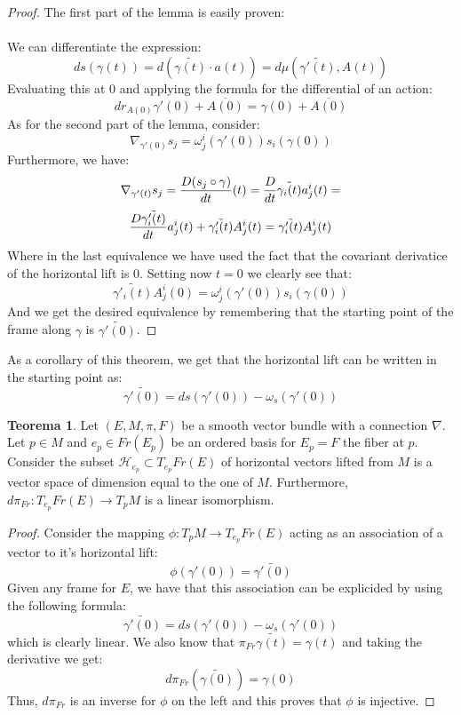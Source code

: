 \documentclass[12pt,a4paper]{report}
\theoremstyle{definition}
\theoremstyle{Theorem}
\newtheorem{Theo}[Def]{Teorema}
\theoremstyle{definition}
\theoremstyle{definition}
\theoremstyle{definition}
\begin{document}
			\begin{proof}
				The first part of the lemma is easily proven:\\
				\\
				We can differentiate the expression:
				$$ds(\gamma(t))=d(\tilde{\gamma(t)}\cdot a(t))=d\mu(\tilde{\gamma'(t)},A(t))$$
				Evaluating this at 0 and applying the formula for the differential of an action:
				$$dr_{A(0)}\gamma'(0)+\overline{A(0)}=\gamma(0)+\overline{A(0)}$$
				As for the second part of the lemma, consider:
				$$\nabla_{\gamma'(0)}s_j=\omega^i_j(\gamma'(0))s_i(\gamma(0))$$
				Furthermore, we have:
				$$\nabla_{\gamma'(t)}s_j={D (s_j\circ \gamma)\over dt}(t)={D\over dt}\tilde{\gamma_i(t)}a^i_j(t)=$$
				$${D\tilde{\gamma'_i(t)}\over dt}a^i_j(t)+\tilde{\gamma'_i(t)}A^i_j(t)=\tilde{\gamma'_i(t)}A^i_j(t)$$
				Where in the last equivalence we have used the fact that the covariant derivatice of the horizontal lift is 0. Setting now $t=0$ we clearly see that:
				$$\tilde{\gamma'_i(t)}A^i_j(0)=\omega^i_j(\gamma'(0))s_i(\gamma(0))$$
				And we get the desired equivalence by remembering that the starting point of the frame along $\gamma$ is $\tilde{\gamma'(0)}$.
			\end{proof}
			As a corollary of this theorem, we get that the horizontal lift can be written in the starting point as:
			$$\tilde{\gamma'(0)}=ds(\gamma'(0))-\omega_s(\gamma'(0))$$
			\begin{Theo}
				Let $(E,M,\pi,F)$ be a smooth vector bundle with a connection $\nabla$. Let $p\in M$ and $e_p\in Fr(E_p)$ be an ordered basis for $E_p=F$ the fiber at $p$. Consider the subset $\mathcal{H}_{e_p}\subset T_{e_p}Fr(E)$ of horizontal vectors lifted from $M$ is a vector space of dimension equal to the one of $M$. Furthermore, $d\pi_{Fr}:T_{e_p}Fr(E)\rightarrow T_pM$ is a linear isomorphism.  
			\end{Theo}
			\begin{proof}
				Consider the mapping $\phi:T_pM\rightarrow T_{e_p}Fr(E)$ acting as an association of a vector to it's horizontal lift:
				$$\phi(\gamma'(0))=\tilde{\gamma'(0)}$$
				Given any frame for $E$, we have that this association can be explicided by using the following formula:
				$$\tilde{\gamma'(0)}=ds(\gamma'(0))-\omega_s(\gamma'(0))$$
				which is clearly linear. We also know that $\pi_{Fr}\tilde{\gamma(t)}=\gamma(t)$ and taking the derivative we get:
				$$d\pi_{Fr}(\tilde{\gamma(0)})=\gamma(0)$$
				Thus, $d\pi_{Fr}$ is an inverse for $\phi$ on the left and this proves that $\phi$ is injective.
			\end{proof}
\end{document}
